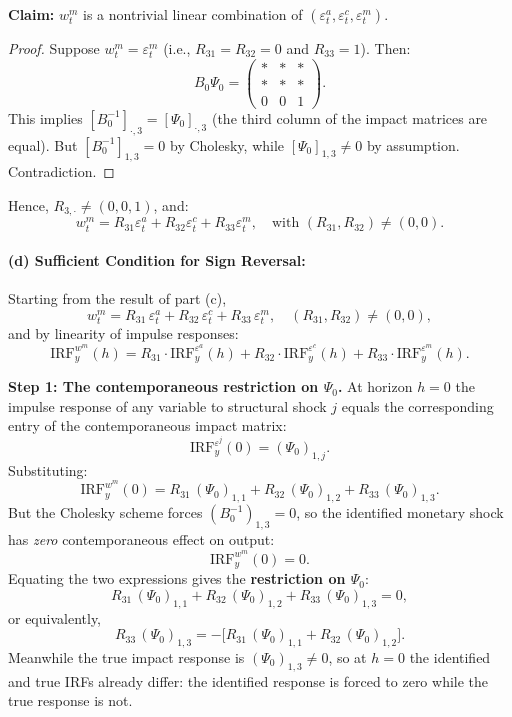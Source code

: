 \documentclass[12pt]{article}
\theoremstyle{definition}
\begin{document}
\noindent \textbf{Claim:} $w_t^m$ is a nontrivial linear combination of $(\varepsilon_t^a, \varepsilon_t^c, \varepsilon_t^m)$.

\begin{proof}
Suppose $w_t^m = \varepsilon_t^m$ (i.e., $R_{31} = R_{32} = 0$ and $R_{33} = 1$). Then:
\[
B_0 \Psi_0 = \begin{pmatrix} * & * & * \\ * & * & * \\ 0 & 0 & 1 \end{pmatrix}.
\]
This implies $[B_0^{-1} ]_{\cdot, 3} = [\Psi_0]_{\cdot, 3}$ (the third column of the impact matrices are equal). But $[B_0^{-1}]_{1,3} = 0$ by Cholesky, while $[\Psi_0]_{1,3} \neq 0$ by assumption. Contradiction.
\end{proof}
\noindent Hence, $R_{3,\cdot} \neq (0, 0, 1)$, and:
\[
\boxed{w_t^m = R_{31} \varepsilon_t^a + R_{32} \varepsilon_t^c + R_{33} \varepsilon_t^m, \quad \text{with } (R_{31}, R_{32}) \neq (0,0).}
\]

\bigskip
\paragraph{(d) Sufficient Condition for Sign Reversal:}
Starting from the result of part (c),
\[
w_t^m = R_{31}\,\varepsilon_t^a + R_{32}\,\varepsilon_t^c + R_{33}\,\varepsilon_t^m,
\quad (R_{31},R_{32})\neq(0,0),
\]
and by linearity of impulse responses:
\[
\text{IRF}_y^{w^m}(h)
= R_{31}\cdot\text{IRF}_y^{\varepsilon^a}(h)
+ R_{32}\cdot\text{IRF}_y^{\varepsilon^c}(h)
+ R_{33}\cdot\text{IRF}_y^{\varepsilon^m}(h).
\]

\noindent\textbf{Step 1: The contemporaneous restriction on $\Psi_0$.}
At horizon $h=0$ the impulse response of any variable to structural shock $j$ equals the corresponding entry of the contemporaneous impact matrix:
\[
\text{IRF}_y^{\varepsilon^j}(0) = (\Psi_0)_{1,j}.
\]
Substituting:
\[
\text{IRF}_y^{w^m}(0)
= R_{31}\,(\Psi_0)_{1,1} + R_{32}\,(\Psi_0)_{1,2} + R_{33}\,(\Psi_0)_{1,3}.
\]
But the Cholesky scheme forces $(B_0^{-1})_{1,3}=0$, so the identified monetary shock has \emph{zero} contemporaneous effect on output:
\[
\text{IRF}_y^{w^m}(0) = 0.
\]
Equating the two expressions gives the \textbf{restriction on $\Psi_0$}:
\[
R_{31}\,(\Psi_0)_{1,1} + R_{32}\,(\Psi_0)_{1,2} + R_{33}\,(\Psi_0)_{1,3} = 0,
\]
or equivalently,
\[
R_{33}\,(\Psi_0)_{1,3} = -\bigl[R_{31}\,(\Psi_0)_{1,1} + R_{32}\,(\Psi_0)_{1,2}\bigr]. \tag{$*$}
\]
Meanwhile the true impact response is $(\Psi_0)_{1,3}\neq 0$, so at $h=0$ the identified and true IRFs already differ: the identified response is forced to zero while the true response is not.
\end{document}
